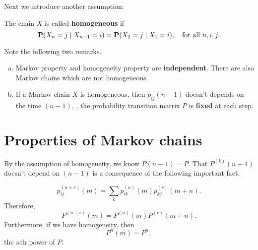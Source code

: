 Next we introduce another assumption:
\begin{definition}
The chain $X$ is called \textbf{homogeneous} if
\begin{equation*}
    \mathbf{P}(X_n = j \;\vert\; X_{n-1} = i) = \mathbf{P}(X_2 = j \;\vert\; X_1 = i), \quad \text{for all } n, i, j.
\end{equation*}
\end{definition}

\begin{remark}
Note the following two remarks.
\begin{enumerate}[(a)]
    \item Markov property and homogeneity property are \textbf{independent}. There are also Markov chains which are not homogeneous. 
    \item If a Markov chain $X$ is homogeneous, then $p_{ij}(n-1)$ doesn't depends on the time $(n-1)$, \ie, the probability transition matrix $P$ is \textbf{fixed} at each step.
\end{enumerate}
\end{remark}

\section{Properties of Markov chains}
By the assumption of homogeneity, we know $P(n-1) = P$. That $P^{(k)}(n-1)$ doesn't depend on $(n-1)$ is a consequence of the following important fact.

\begin{theorem}
\begin{equation*}
    p_{ij}^{(n+r)}(m) = \sum_{k} p_{ik}^{(n)}(m) p_{kj}^{(r)}(m+n).
\end{equation*}
Therefore, 
\begin{equation*}
    P^{(n+r)}(m) = P^{(n)}(m) P^{(r)}(m+n).
\end{equation*}
Furthermore, if we have homogeneity, then 
\begin{equation*}
    P^{n}(m) = P^n,
\end{equation*}
the $n$th power of $P$.
\end{theorem}

